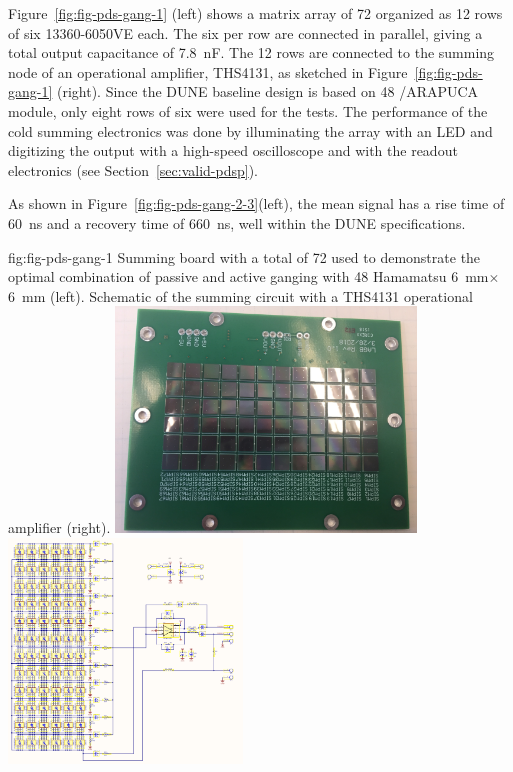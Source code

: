 Figure~\ref{fig:fig-pds-gang-1} (left) shows a matrix array of 72  organized as 12 rows of six  13360-6050VE  each. 
The six  per row are connected in parallel, giving a total output capacitance of \SI{7.8}{nF}. The 12 rows are connected to the summing node of an operational amplifier, THS4131, as sketched in Figure~\ref{fig:fig-pds-gang-1} (right). 
Since the DUNE baseline design is based on 48 /ARAPUCA module, only eight rows of six were used for the tests. 
The performance of the cold summing electronics was done by illuminating the  array with an LED and digitizing the output with a high-speed oscilloscope and with the  readout electronics (see 
Section~\ref{sec:valid-pdsp}).

As shown in Figure~\ref{fig:fig-pds-gang-2-3}(left), the mean signal has a rise time of \SI{60}{ns} and a recovery time of \SI{660}{ns}, well within the DUNE  specifications.

\begin{dunefigure}
 {fig:fig-pds-gang-1}
 {Summing board with a total of 72  used to demonstrate the optimal combination of passive and active ganging with 48 Hamamatsu \SI{6}{mm}$\times$\SI{6}{mm}  (left).  Schematic of the summing circuit with a THS4131 operational amplifier (right).}
\includegraphics[height=6cm]{graphics/pds_gang_fig1.jpg}
\includegraphics[height=6cm]{graphics/pds_gang_fig2.png}
\end{dunefigure}

